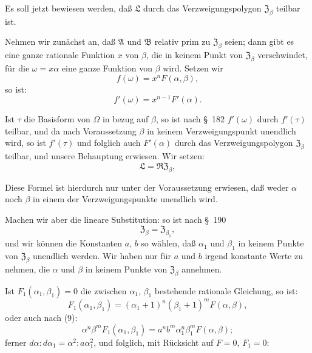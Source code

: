 Es soll jetzt bewiesen werden, da\ss{} $\mathfrak{L}$ durch das Verzweigungspolygon $\mathfrak{Z}_\beta$ teilbar ist.

Nehmen wir zun\"achst an, da\ss{} $\mathfrak{A}$ und $\mathfrak{B}$ relativ prim zu $\mathfrak{Z}_\beta$ seien; dann gibt es eine ganze rationale Funktion $x$ von $\beta$, die in keinem Punkt von $\mathfrak{Z}_\beta$ verschwindet, f\"ur die $\omega = x\alpha$ eine ganze Funktion von $\beta$ wird. Setzen wir
\[
f(\omega) = x^n F(\alpha,\beta),
\]
so ist:
\[
f'(\omega) = x^{n-1}F'(\alpha).
\]

Ist $\tau$ die Basisform von $\Omega$ in bezug auf $\beta$, so ist nach \S\ 182 $f'(\omega)$ durch $f'(\tau)$ teilbar, und da nach Voraussetzung $\beta$ in keinem Verzweigungspunkt unendlich wird, so ist $f'(\tau)$ und folglich auch $F'(\alpha)$ durch das Verzweigungspolygon $\mathfrak{Z}_\beta$ teilbar, und unsere Behauptung erwiesen. Wir setzen:
\[
\mathfrak{L} = \mathfrak{R}\mathfrak{Z}_\beta,
\]

Diese Formel ist hierdurch nur unter der Voraussetzung erwiesen, da\ss{} weder $\alpha$ noch $\beta$ in einem der Verzweigungspunkte unendlich wird.

Machen wir aber die lineare Substitution:
so ist nach \S\ 190
\[
\mathfrak{Z}_\beta = \mathfrak{Z}_{\beta_1},
\]
und wir k\"onnen die Konstanten $a$, $b$ so w\"ahlen, da\ss{} $\alpha_1$ und $\beta_1$ in keinem Punkte von $\mathfrak{Z}_\beta$ unendlich werden. Wir haben nur f\"ur $a$ und $b$ irgend konstante Werte zu nehmen, die $\alpha$ und $\beta$ in keinem Punkte von $\mathfrak{Z}_\beta$ annehmen.

Ist $F_1(\alpha_1,\beta_1)=0$ die zwischen $\alpha_1$, $\beta_1$ bestehende rationale Gleichung, so ist:
\[
F_1(\alpha_1,\beta_1) = (\alpha_1+1)^n(\beta_1+1)^m F(\alpha,\beta),
\]
oder auch nach (9):
\[
\alpha^n\beta^m F_1(\alpha_1,\beta_1) = a^n b^m \alpha_1^n \beta_1^m F(\alpha,\beta);
\]
ferner $d\alpha : d\alpha_1 = \alpha^2 : a\alpha_1^2$, und folglich, mit R\"ucksicht auf $F=0$, $F_1=0$:
